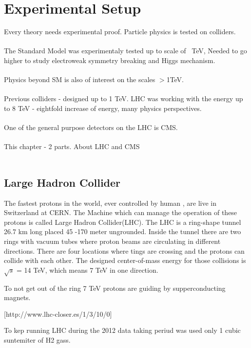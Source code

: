 \chapter{Experimental Setup}
Every theory needs experimental proof. Particle physics is tested on colliders.
\\
\\
The Standard Model was experimentaly tested up to scale of ~TeV, Needed to go higher to 
study electroweak symmetry breaking and Higgs mechanism.
\\
\\
Physics beyond SM is also of interest on the scales $>$1TeV.
\\
\\
Previous colliders - designed up to 1 TeV. LHC \cite{LHCmachine} was working with the energy
up to 8 TeV - eightfold increase of energy, many physics perspectives.
\\
\\
One of the general purpose detectors on the LHC is CMS.
\\
\\
This chapter - 2 parts. About LHC and CMS
\\
\\

\section{Large Hadron Collider}

The fastest protons in the world, ever controlled by human , are live in Switzerland at CERN.
The Machine which can manage the operation of these protons is called Large Hadron Collider(LHC). 
The LHC is a ring-shape tunnel 26.7 km long  placed 45 -170 meter ungrounded. 
Inside the tunnel there are two rings with vacuum tubes where proton beams are circulating in different directions.
There are four locations where tings are crossing and the protons can collide with each other. 
The designed center-of-mass energy for those collisions is $\sqrt{s}$ = 14 TeV, which means 7 TeV in one direction.


To not get out of the ring 7 TeV protons are guiding by supperconducting magnets. 



[http://www.lhc-closer.es/1/3/10/0]

To kep running LHC during the 2012 data taking periud was used only 1 cubic suntemiter of H2 gass.

